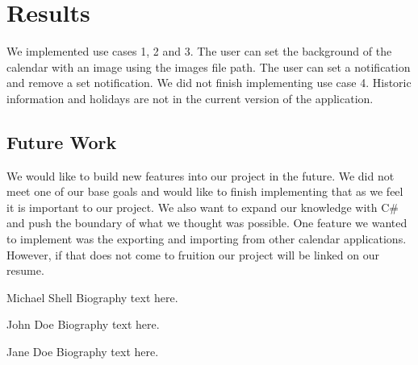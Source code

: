 \documentclass[10pt,conference,onecolumn,compsoc]{IEEEtran}
\begin{document}
\section{Results}
We implemented use cases 1, 2 and 3. The user can set the background of the calendar with an image using the images file path. The user can set a notification and remove a set notification. We did not finish implementing use case 4. Historic information and holidays are not in the current version of the application.


\subsection{Future Work}
We would like to build new features into our project in the future. We did not meet one of our base goals and would like to finish implementing that as we feel it is important to our project. We also want to expand our knowledge with C\# and push the boundary of what we thought was possible. One feature we wanted to implement was the exporting and importing from other calendar applications. However, if that does not come to fruition our project will be linked on our resume.






\begin{IEEEbiography}{Michael Shell}
Biography text here.
\end{IEEEbiography}

\begin{IEEEbiographynophoto}{John Doe}
Biography text here.
\end{IEEEbiographynophoto}


\begin{IEEEbiographynophoto}{Jane Doe}
Biography text here.
\end{IEEEbiographynophoto}





\end{document}
